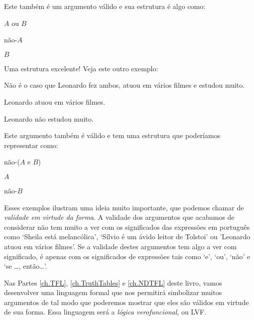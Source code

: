 Este também é um argumento válido e sua estrutura é algo como:
	\begin{earg}
		\item[] $A$ ou $B$
		\item[] não-$A$
		\item[\therefore] $B$
	\end{earg}
Uma estrutura excelente! Veja este outro exemplo:
	\begin{earg}
		\item[] Não é o caso que Leonardo fez ambos, atuou em vários filmes e estudou muito.
		\item[] Leonardo atuou em vários filmes.
		\item[\therefore] Leonardo não estudou muito.
	\end{earg}
Este argumento também é válido e tem uma estrutura que poderíamos representar como:
	\begin{earg}
		\item[] não-($A$ e $B$)
		\item[] $A$
		\item[\therefore] não-$B$
	\end{earg}
Esses exemplos ilustram uma ideia muito importante, que podemos chamar de \emph{validade em virtude da forma}.
A validade dos argumentos que acabamos de considerar não tem muito a ver com os significados das expressões em português como `Sheila está melancólica', `Sílvio é um ávido leitor de Tolstoi' ou 'Leonardo atuou em vários filmes'.
Se a validade destes argumentos tem algo a ver com significado, é apenas com os significados de expressões tais como `e', `ou', `não' e `se \ldots, então\ldots'.

Nas Partes \ref{ch.TFL}, \ref{ch.TruthTables} e \ref{ch.NDTFL} deste livro, vamos desenvolver uma linguagem formal que nos permitirá simbolizar muitos argumentos de tal modo que poderemos mostrar que eles são válidos em virtude de sua forma.
Essa linguagem será a \emph{lógica verofuncional}, ou LVF.


